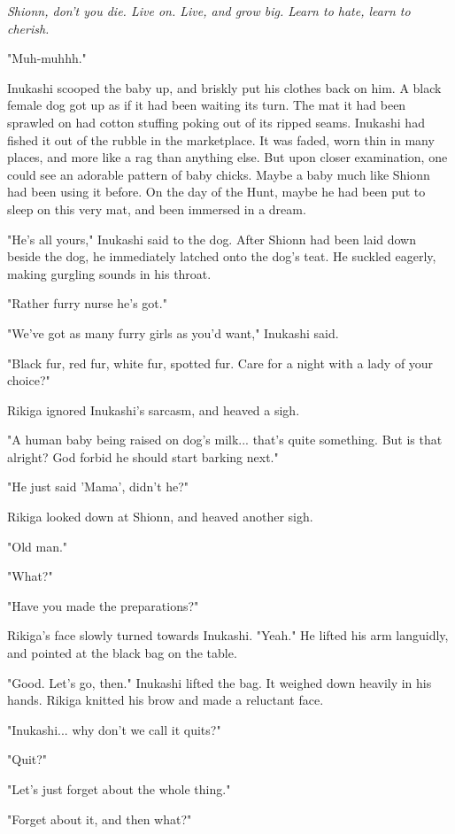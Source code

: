 \emph{Shionn, don't you die. Live on. Live, and grow big. Learn to hate, learn
to cherish.}

"Muh-muhhh."

Inukashi scooped the baby up, and briskly put his clothes back on him. A
black female dog got up as if it had been waiting its turn. The mat it
had been sprawled on had cotton stuffing poking out of its ripped seams.
Inukashi had fished it out of the rubble in the marketplace. It was
faded, worn thin in many places, and more like a rag than anything else.
But upon closer examination, one could see an adorable pattern of baby
chicks. Maybe a baby much like Shionn had been using it before. On the
day of the Hunt, maybe he had been put to sleep on this very mat, and
been immersed in a dream.

"He's all yours," Inukashi said to the dog. After Shionn had been laid
down beside the dog, he immediately latched onto the dog's teat. He
suckled eagerly, making gurgling sounds in his throat.

"Rather furry nurse he's got."

"We've got as many furry girls as you'd want," Inukashi said.~

"Black fur, red fur, white fur, spotted fur. Care for a night with a
lady of your choice?"

Rikiga ignored Inukashi's sarcasm, and heaved a sigh.

"A human baby being raised on dog's milk... that's quite something. But
is that alright? God forbid he should start barking next."

"He just said 'Mama', didn't he?"

Rikiga looked down at Shionn, and heaved another sigh.

"Old man."

"What?"

"Have you made the preparations?"

Rikiga's face slowly turned towards Inukashi. "Yeah." He lifted his arm
languidly, and pointed at the black bag on the table.

"Good. Let's go, then." Inukashi lifted the bag. It weighed down heavily
in his hands. Rikiga knitted his brow and made a reluctant face.

"Inukashi... why don't we call it quits?"

"Quit?"

"Let's just forget about the whole thing."

"Forget about it, and then what?"

